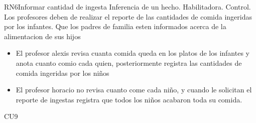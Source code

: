 \begin{BussinesRule}{RN6}{Informar cantidad de ingesta}
	\BRitem[Tipo:] Inferencia de un hecho.
	\BRitem[Clase:] Habilitadora. 
	\BRitem[Nivel:] Control. %
	\BRitem[Descripción:] Los profesores deben de realizar el reporte de las cantidades de comida ingeridas por los infantes.
        \BRitem[Motivacion] Que los padres de familia esten informados acerca de la alimentacion de sus hijos
	        \begin{itemize}
	            \item El profesor alexis revisa cuanta comida queda en los platos de los infantes y anota cuanto comio cada quien, posteriormente registra las cantidades de comida ingeridas por los niños
	        \end{itemize}
	        \begin{itemize}
	            \item El profesor horacio no revisa cuanto come cada niño, y cuando le solicitan el reporte de ingestas registra que todos los niños acabaron toda su comida.
	        \end{itemize}
	CU9 
\end{BussinesRule}

